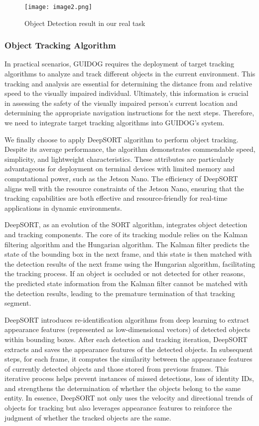 \documentclass{article}
\begin{document}
\begin{figure}
    \centering
    \texttt{[image: image2.png]}
    \caption{Object Detection result in our real task}
    \label{fig:enter-label}
\end{figure}

\subsubsection{Object Tracking Algorithm}
In practical scenarios, GUIDOG requires the deployment of target tracking algorithms to analyze and track different objects in the current environment. This tracking and analysis are essential for determining the distance from and relative speed to the visually impaired individual. Ultimately, this information is crucial in assessing the safety of the visually impaired person's current location and determining the appropriate navigation instructions for the next steps. Therefore, we need to integrate target tracking algorithms into GUIDOG's system.

We finally choose to apply DeepSORT algorithm to perform object tracking. Despite its average performance, the algorithm demonstrates commendable speed, simplicity, and lightweight characteristics. These attributes are particularly advantageous for deployment on terminal devices with limited memory and computational power, such as the Jetson Nano. The efficiency of DeepSORT aligns well with the resource constraints of the Jetson Nano, ensuring that the tracking capabilities are both effective and resource-friendly for real-time applications in dynamic environments.

DeepSORT, as an evolution of the SORT algorithm, integrates object detection and tracking components. The core of its tracking module relies on the Kalman filtering algorithm and the Hungarian algorithm. The Kalman filter predicts the state of the bounding box in the next frame, and this state is then matched with the detection results of the next frame using the Hungarian algorithm, facilitating the tracking process. If an object is occluded or not detected for other reasons, the predicted state information from the Kalman filter cannot be matched with the detection results, leading to the premature termination of that tracking segment.

DeepSORT introduces re-identification algorithms from deep learning to extract appearance features (represented as low-dimensional vectors) of detected objects within bounding boxes. After each detection and tracking iteration, DeepSORT extracts and saves the appearance features of the detected objects. In subsequent steps, for each frame, it computes the similarity between the appearance features of currently detected objects and those stored from previous frames. This iterative process helps prevent instances of missed detections, loss of identity IDs, and strengthens the determination of whether the objects belong to the same entity. In essence, DeepSORT not only uses the velocity and directional trends of objects for tracking but also leverages appearance features to reinforce the judgment of whether the tracked objects are the same.
\end{document}
